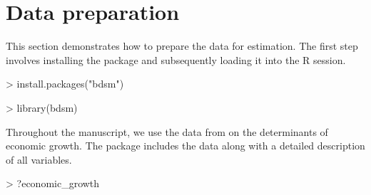 \documentclass[a4paper]{article}
\begin{document}
\section{Data preparation}\label{data}
This section demonstrates how to prepare the data for estimation.
The first step involves installing the package and subsequently loading it into the R session.
\begin{Schunk}
\begin{Sinput}
> install.packages("bdsm")
\end{Sinput}
\end{Schunk}
\begin{Schunk}
\begin{Sinput}
> library(bdsm)
\end{Sinput}
\end{Schunk}
Throughout the manuscript, we use the data from \citet{Moral+2016} on the determinants of economic growth.
The package includes the data along with a detailed description of all variables.
\begin{Schunk}
\begin{Sinput}
> ?economic_growth
\end{Sinput}
\end{Schunk}
\end{document}
